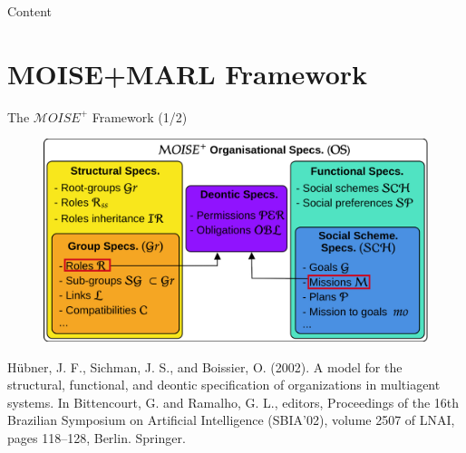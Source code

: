\documentclass[9pt, aspectratio=169]{beamer}
\begin{document}


\begin{frame}{Content}
  \tableofcontents
\end{frame}




% 



\section{MOISE+MARL Framework}

\begin{frame}{The $\mathcal{M}OISE^+$ Framework (1/2)}

  \begin{figure}
    \centering
    \includegraphics[width=0.75\linewidth]{figures/moise_model.png}
  \end{figure}

  \begin{spacing}{0.25}
    {\tiny Hübner, J. F., Sichman, J. S., and Boissier, O. (2002).
      A model for the structural, functional, and deontic specification of
      organizations in multiagent systems.
      In Bittencourt, G. and Ramalho, G. L., editors, Proceedings of the 16th Brazilian Symposium on Artificial Intelligence (SBIA’02), volume 2507 of LNAI, pages 118–128, Berlin. Springer.}
  \end{spacing}

\end{frame}
\end{document}
